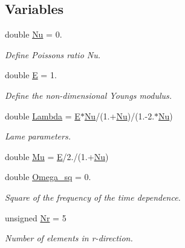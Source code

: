\subsection*{Variables}
\begin{DoxyCompactItemize}
\item 
double \hyperlink{namespaceGlobal__Parameters_a20fccdcfa2c15ad8b951b9ada3bb1661}{Nu} = 0.
\begin{DoxyCompactList}\small\item\em Define Poisson\textquotesingle{}s ratio Nu. \end{DoxyCompactList}\item 
double \hyperlink{namespaceGlobal__Parameters_aa3dfbdb1b2fd80d516850f66c96b6fd0}{E} = 1.
\begin{DoxyCompactList}\small\item\em Define the non-\/dimensional Young\textquotesingle{}s modulus. \end{DoxyCompactList}\item 
double \hyperlink{namespaceGlobal__Parameters_ae2f84a82174136947cce7a0d137097ae}{Lambda} = \hyperlink{namespaceGlobal__Parameters_aa3dfbdb1b2fd80d516850f66c96b6fd0}{E}$\ast$\hyperlink{namespaceGlobal__Parameters_a20fccdcfa2c15ad8b951b9ada3bb1661}{Nu}/(1.+\hyperlink{namespaceGlobal__Parameters_a20fccdcfa2c15ad8b951b9ada3bb1661}{Nu})/(1.-\/2.$\ast$\hyperlink{namespaceGlobal__Parameters_a20fccdcfa2c15ad8b951b9ada3bb1661}{Nu})
\begin{DoxyCompactList}\small\item\em Lame parameters. \end{DoxyCompactList}\item 
double \hyperlink{namespaceGlobal__Parameters_a490d7680a7de63058a9c921e2705a103}{Mu} = \hyperlink{namespaceGlobal__Parameters_aa3dfbdb1b2fd80d516850f66c96b6fd0}{E}/2./(1.+\hyperlink{namespaceGlobal__Parameters_a20fccdcfa2c15ad8b951b9ada3bb1661}{Nu})
\item 
double \hyperlink{namespaceGlobal__Parameters_af9e1e178dfb7f5e35b452599bd4c4324}{Omega\+\_\+sq} = 0.
\begin{DoxyCompactList}\small\item\em Square of the frequency of the time dependence. \end{DoxyCompactList}\item 
unsigned \hyperlink{namespaceGlobal__Parameters_aeebb1e39d849d32cebdc9be13026606e}{Nr} = 5
\begin{DoxyCompactList}\small\item\em Number of elements in r-\/direction. \end{DoxyCompactList}\item 

\end{DoxyCompactItemize}
